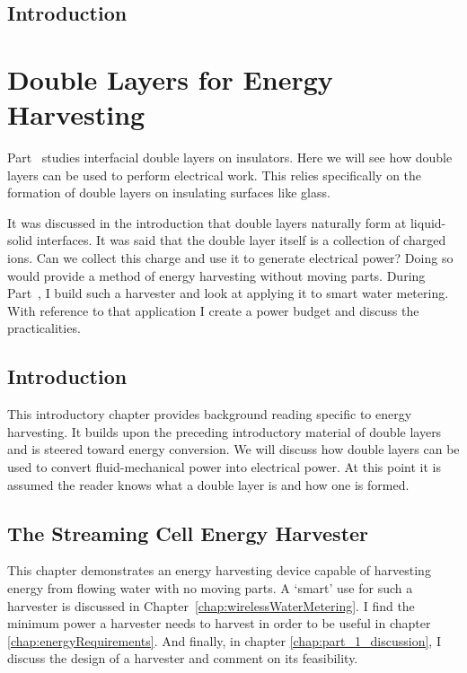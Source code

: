 
\chapter{Introduction}
  \label{chap:introduction_main}
  


\part{Double Layers for Energy Harvesting}
  \label{part:doubleLayersOnInsulators}
  Part~\ref{part:doubleLayersOnInsulators} studies interfacial double layers on insulators.
  Here we will see how double layers can be used to perform electrical work.
  This relies specifically on the formation of double layers on insulating surfaces like glass.

  It was discussed in the introduction that double layers naturally form at liquid-solid interfaces.
  It was said that the double layer itself is a collection of charged ions.
  Can we collect this charge and use it to generate electrical power?
  Doing so would provide a method of energy harvesting without moving parts.
  During Part~\ref{part:doubleLayersOnInsulators}, I build such a harvester and look at applying it to smart water metering.
  With reference to that application I create a power budget and discuss the practicalities.

  \chapter{Introduction}
    \label{chap:harvesterIntroduction}
    This introductory chapter provides background reading specific to energy harvesting.
    It builds upon the preceding introductory material of double layers and is steered toward energy conversion.
    We will discuss how double layers can be used to convert fluid-mechanical power into electrical power.
    At this point it is assumed the reader knows what a double layer is and how one is formed.

    

  \chapter{The Streaming Cell Energy Harvester}
    \label{chap:harvestingEnergy}
    This chapter demonstrates an energy harvesting device capable of harvesting energy from flowing water with no moving parts.
    A `smart' use for such a harvester is discussed in Chapter~\ref{chap:wirelessWaterMetering}.
    I find the minimum power a harvester needs to harvest in order to be useful in chapter \ref{chap:energyRequirements}.
    And finally, in chapter \ref{chap:part_1_discussion}, I discuss the design of a harvester and comment on its feasibility.

